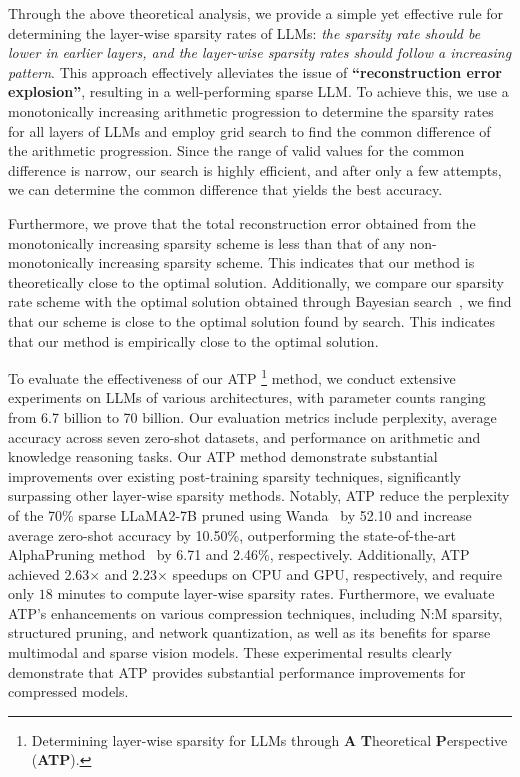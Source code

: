 Through the above theoretical analysis, we provide a simple yet effective rule for determining the layer-wise sparsity rates of LLMs: \textit{the sparsity rate should be lower in earlier layers, and the layer-wise sparsity rates should follow a increasing pattern}. This approach effectively alleviates the issue of \textbf{``reconstruction error explosion''}, resulting in a well-performing sparse LLM. To achieve this, we use a monotonically increasing arithmetic progression to determine the sparsity rates for all layers of LLMs and employ grid search to find the common difference of the arithmetic progression. Since the range of valid values for the common difference is narrow, our search is highly efficient, and after only a few attempts, we can determine the common difference that yields the best accuracy.

Furthermore, we prove that the total reconstruction error obtained from the monotonically increasing sparsity scheme is less than that of any non-monotonically increasing sparsity scheme. This indicates that our method is theoretically close to the optimal solution. Additionally, we compare our sparsity rate scheme with the optimal solution obtained through Bayesian search~\cite{wu2019hyperparameter}, we find that our scheme is close to the optimal solution found by search. This indicates that our method is empirically close to the optimal solution.

To evaluate the effectiveness of our ATP \footnote{Determining layer-wise sparsity for LLMs through \textbf{A} \textbf{T}heoretical \textbf{P}erspective (\textbf{ATP}).} method, we conduct extensive experiments on LLMs of various architectures, with parameter counts ranging from 6.7 billion to 70 billion. Our evaluation metrics include perplexity, average accuracy across seven zero-shot datasets, and performance on arithmetic and knowledge reasoning tasks. Our ATP method demonstrate substantial improvements over existing post-training sparsity techniques, significantly surpassing other layer-wise sparsity methods. Notably, ATP reduce the perplexity of the 70$\%$ sparse LLaMA2-7B pruned using Wanda~\cite{sun2023simple} by 52.10 and increase average zero-shot accuracy by 10.50$\%$, outperforming the state-of-the-art AlphaPruning method~\cite{lu2024alphapruning} by 6.71 and 2.46$\%$, respectively. Additionally, ATP achieved 2.63$\times$ and 2.23$\times$ speedups on CPU and GPU, respectively, and require only $18$ minutes to compute layer-wise sparsity rates. Furthermore, we evaluate ATP's enhancements on various compression techniques, including N:M sparsity, structured pruning, and network quantization, as well as its benefits for sparse multimodal and sparse vision models. These experimental results clearly demonstrate that ATP provides substantial performance improvements for compressed models.